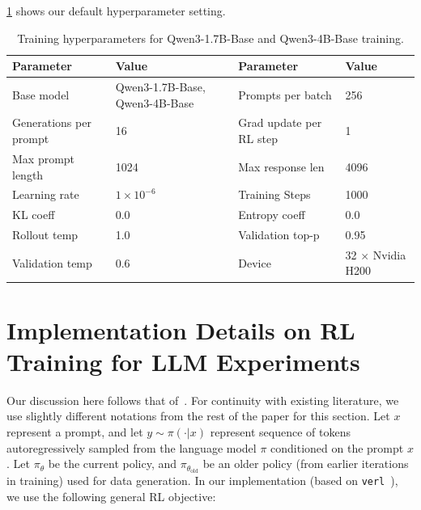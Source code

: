 \documentclass[10pt]{article} %
\begin{document}
\cref{tab:config_qwen} shows our default hyperparameter setting.

\begin{table}[h!]
  \caption{Training hyperparameters for Qwen3-1.7B-Base and Qwen3-4B-Base training.}
  \label{tab:config_qwen}
  \centering
  \begin{tcolorbox}[
    enhanced,
    hbox,
    title={\hspace{0.0cm} Training hyperparameters for Qwen3-1.7B-Base and Qwen3-4B-Base},
    colback=teal!5,
    colframe=teal,      
    coltext=black,
    coltitle=white,
    fonttitle=\bfseries,
    arc=1mm,
    boxrule=1pt,
    boxsep=1pt,                
    left=2pt, right=2pt,       
    top=0pt,                   
    bottom=2pt,       
    toptitle=3pt, bottomtitle=3pt,
    center
  ]
    \small
    \renewcommand{\arraystretch}{1.2}
    \setlength{\tabcolsep}{12pt}
\begin{tabular}{l|l|l|l} 
  \textbf{Parameter} & \textbf{Value} & \textbf{Parameter} & \textbf{Value} \\
  \hline
  Base model & Qwen3-1.7B-Base, Qwen3-4B-Base  & Prompts per batch & 256 \\
  Generations per prompt & 16 & Grad update per RL step & 1 \\
  Max prompt length & 1024 & Max response len & 4096 \\
  Learning rate & $1 \times 10^{-6}$ &  Training Steps & 1000 \\
  KL coeff & 0.0 & Entropy coeff & 0.0 \\
  Rollout temp & 1.0 & Validation top-p & 0.95 \\
  Validation temp & 0.6 & Device & 32 $\times$ Nvidia H200 \\
\end{tabular}
  \end{tcolorbox}
\end{table}

\newpage

\section{Implementation Details on RL Training for LLM Experiments}

Our discussion here follows that of~\citep{shafayat2025largereasoningmodelsselftrain}. For continuity with existing literature, we use slightly different notations from the rest of the paper for this section. Let $x$ represent a prompt, and let $y \sim \pi(\cdot|x)$ represent sequence of tokens autoregressively sampled from the language model $\pi$ conditioned on the prompt $x$. Let $\pi_\theta$ be the current policy, and $\pi_{\theta_\text{old}}$ be an older policy (from earlier iterations in training) used for data generation. In our implementation (based on \texttt{verl}~\citep{zhang2024framework,sheng2024hybridflow}), we use the following general RL objective:
\end{document}
